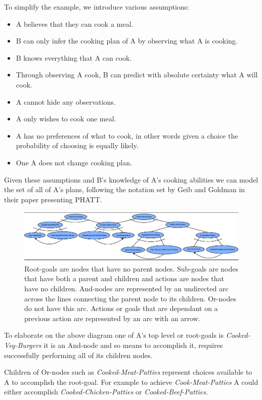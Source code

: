 \documentclass[parskip]{cs4rep}
\begin{document}
To simplify the example, we introduce various assumptions:

\begin{itemize}
\item
A believes that they can cook a meal.
\item
B can only infer the cooking plan of A by observing what A is cooking.
\item
B knows everything that A can cook.
\item
Through observing A cook, B can predict with absolute certainty what A will cook.
\item
A cannot hide any observations.
\item
A only wishes to cook one meal.
\item
A has no preferences of what to cook, in other words given a choice the probability of choosing is equally likely.
\item
One A does not change cooking plan.
\end{itemize}

Given these assumptions and B's knowledge of A's cooking abilities we can model the set of all of A's plans, following the notation set by Geib and Goldman in their paper presenting PHATT.

\begin{figure}[h]
\centerline{
	\includegraphics{images/example-plan-library}
}
\caption{Root-goals are nodes that have no parent nodes. Sub-goals are nodes that have both a parent and children and actions are nodes that have no children. And-nodes are represented by an undirected arc across the lines connecting the parent node to its children. Or-nodes do not have this arc. Actions or goals that are dependant on a previous action are represented by an arc with an arrow.}
\label{fig:example-plan-library}
\end{figure}

To elaborate on the above diagram one of A's top level or root-goals is \textit{Cooked-Veg-Burgers} it is an And-node and so means to accomplish it, requires successfully performing all of its children nodes. 

Children of Or-nodes such as \textit{Cooked-Meat-Patties} represent choices available to A to accomplish the root-goal. For example to achieve \textit{Cook-Meat-Patties} A could either accomplish \textit{Cooked-Chicken-Patties} or \textit{Cooked-Beef-Patties}.
\end{document}
